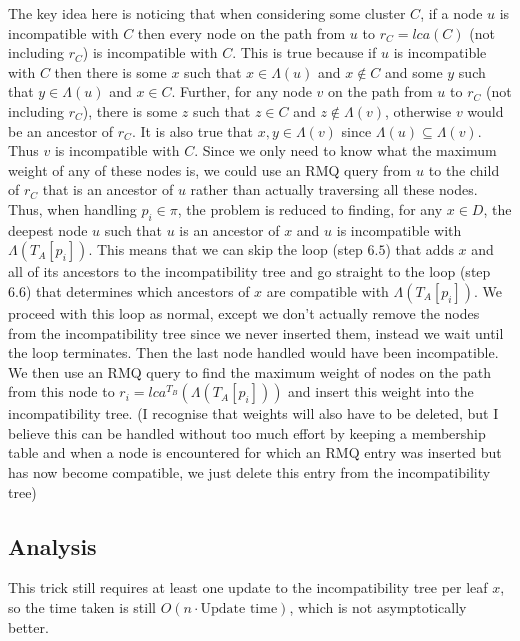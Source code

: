 \documentclass[a4paper]{article}
\begin{document}
    The key idea here is noticing that when considering some cluster $C$, if a node $u$ is incompatible with $C$ then every node on the path from $u$ to $r_C = lca(C)$ (not including $r_C$) is incompatible with $C$. This is true because if $u$ is incompatible with $C$ then there is some $x$ such that $x \in \Lambda(u)$ and $x \not\in C$ and some $y$ such that $y \in \Lambda(u)$ and $x \in C$. Further, for any node $v$ on the path from $u$ to $r_C$ (not including $r_C$), there is some $z$ such that $z \in C$ and $z \not\in \Lambda(v)$, otherwise $v$ would be an ancestor of $r_C$. It is also true that $x, y \in \Lambda(v)$ since $\Lambda(u) \subseteq \Lambda(v)$. Thus $v$ is incompatible with $C$. Since we only need to know what the maximum weight of any of these nodes is, we could use an RMQ query from $u$ to the child of $r_C$ that is an ancestor of $u$ rather than actually traversing all these nodes.\\

    Thus, when handling $p_i \in \pi$, the problem is reduced to finding, for any $x \in D$, the deepest node $u$ such that $u$ is an ancestor of $x$ and $u$ is incompatible with $\Lambda(T_A[p_i])$. This means that we can skip the loop (step $6.5$) that adds $x$ and all of its ancestors to the incompatibility tree and go straight to the loop (step $6.6$) that determines which ancestors of $x$ are compatible with $\Lambda(T_A[p_i])$. We proceed with this loop as normal, except we don't actually remove the nodes from the incompatibility tree since we never inserted them, instead we wait until the loop terminates. Then the last node handled would have been incompatible. We then use an RMQ query to find the maximum weight of nodes on the path from this node to $r_i = lca^{T_B}(\Lambda(T_A[p_i]))$ and insert this weight into the incompatibility tree. (I recognise that weights will also have to be deleted, but I believe this can be handled without too much effort by keeping a membership table and when a node is encountered for which an RMQ entry was inserted but has now become compatible, we just delete this entry from the incompatibility tree)

    \subsection{Analysis}

    This trick still requires at least one update to the incompatibility tree per leaf $x$, so the time taken is still $O(n \cdot \text{Update time})$, which is not asymptotically better.
\end{document}
